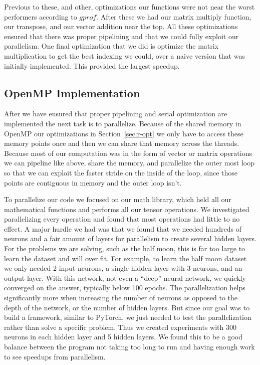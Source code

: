 Previous to these, and other, optimizations our functions were not near the
worst performers according to $gprof$. After these we had our matrix multiply
function, our transpose, and our vector addition near the top. All these
optimizations ensured that there was proper pipelining and that we could fully
exploit our parallelism. One final optimization that we did is optimize the
matrix multiplication to get the best indexing we could, over a naive version
that was initially implemented. This provided the largest speedup.

\subsection{OpenMP Implementation}\label{sec:r-omp} 

After we have ensured that proper pipelining and serial optimization are
implemented the next task is to parallelize. Because of the shared memory in
OpenMP our optimizations in Section~\ref{sec:r-opt} we only have to access these
memory points once and then we can share that memory across the threads. Because
most of our computation was in the form of vector or matrix operations we can
pipeline like above, share the memory, and parallelize the outer most loop so
that we can exploit the faster stride on the inside of the loop, since those
points are contiguous in memory and the outer loop isn't. 

To parallelize our code we focused on our math library, which held all our
mathematical functions and performs all our tensor operations. We investigated
parallelizing every operation and found that most operations had little to no
effect. A major hurdle we had was that we found that we needed hundreds of
neurons and a fair amount of layers for parallelism to create several hidden
layers. For the problems we are solving, such as the half moon, this is far too
large to learn the dataset and will over fit. For example, to learn the half
moon dataset we only needed 2 input neurons, a single hidden layer with 3 neurons,
and an output layer. With this network, not even a ``deep'' neural network,
we quickly converged on the answer, typically below 100 epochs. The
parallelization helps significantly more when increasing the number of neurons
as opposed to the depth of the network, or the number of hidden layers. But
since our goal was to build a framework, similar to PyTorch, we just needed to
test the parallelization rather than solve a specific problem. Thus we created
experiments with 300 neurons in each hidden layer and 5 hidden layers. We found
this to be a good balance between the program not taking too long to run and
having enough work to see speedups from parallelism. 

